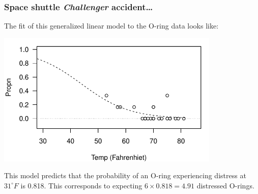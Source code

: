 \documentclass{beamer}\usepackage[]{graphicx}\usepackage[]{xcolor}
\begin{document}
\begin{frame}
\frametitle{Space shuttle {\em Challenger} accident\ldots}

The fit of this generalized linear model to the O-ring data looks like:
\begin{center}
\includegraphics[width=0.8\textwidth]{Figures/AllOringsGLM}
\end{center}

This model predicts that the probability of an O-ring experiencing distress at $31^{\circ}F$ is 0.818. This corresponds to expecting $6 \times 0.818 = 4.91$ distressed O-rings.
\end{frame}



\end{document}
